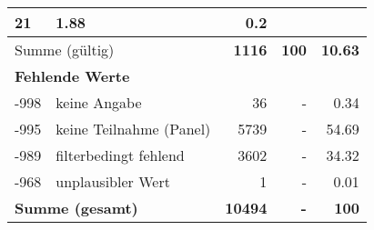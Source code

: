 \begin{longtable}{lXrrr}
       \num{21} &
       \num[round-mode=places,round-precision=2]{1,88} &
         \num[round-mode=places,round-precision=2]{0,2} \\
     \midrule
     \multicolumn{2}{l}{Summe (gültig)} &
       \textbf{\num{1116}} &
     \textbf{100} &
       \textbf{\num[round-mode=places,round-precision=2]{10,63}} \\
     \multicolumn{5}{l}{\textbf{Fehlende Werte}}\\
       -998 &
       keine Angabe &
         \num{36} &
        - &
         \num[round-mode=places,round-precision=2]{0,34} \\
       -995 &
       keine Teilnahme (Panel) &
         \num{5739} &
        - &
         \num[round-mode=places,round-precision=2]{54,69} \\
       -989 &
       filterbedingt fehlend &
         \num{3602} &
        - &
         \num[round-mode=places,round-precision=2]{34,32} \\
       -968 &
       unplausibler Wert &
         \num{1} &
        - &
         \num[round-mode=places,round-precision=2]{0,01} \\
     \midrule
     \multicolumn{2}{l}{\textbf{Summe (gesamt)}} &
          \textbf{\num{10494}} &
        \textbf{-} &
        \textbf{100} \\
     \bottomrule
     \end{longtable}
     
